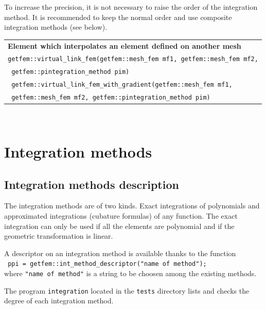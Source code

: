 \documentclass[10pt,a4paper]{article}
\begin{document}
To increase the precision, it is not necessary to raise the order of the integration method. It is recommended to keep the normal order and use composite integration methods (see below).

\begin{center}
\begin{tabular}{|m{16.11cm}|} \hline 
{ \bf Element which interpolates an element defined on another mesh}\\
  {\tt getfem::virtual\_link\_fem(getfem::mesh\_fem mf1, getfem::mesh\_fem mf2,} \\ {\tt \mbox{}\hspace{12em} getfem::pintegration\_method pim) } \\
  {\tt \mbox{}\hspace{5em} getfem::virtual\_link\_fem\_with\_gradient(getfem::mesh\_fem mf1, } \\ {\tt \hspace{5em} getfem::mesh\_fem mf2, \mbox{}getfem::pintegration\_method pim) } \\  \hline 
\end{tabular} \\ \vspace{-1pt} 
\end{center}

\section{Integration methods}

\subsection{Integration methods description}

The integration methods are of two kinds. Exact integrations of polynomials and approximated integrations (cubature formulas) of any function. The exact integration can only be used if all the elements are polynomial and if the geometric transformation is linear.

 A descriptor on an integration method is available thanks to the function\\[0.5cm]
{\tt
  ppi = getfem::int\_method\_descriptor("name of method");
}\\[0.5cm]
where {\tt "name of method"} is a string to be choosen among the existing methods.

The program \texttt{integration} located in the \texttt{tests} directory lists and checks the degree of each integration method.
\end{document}
